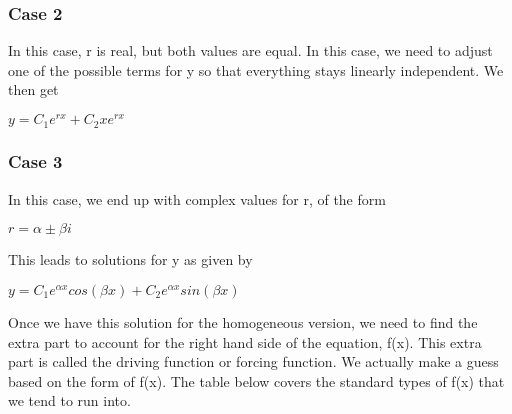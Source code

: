 \documentclass[
  letterpaper,
]{report}
\begin{document}
\subsubsection{Case 2}\label{case-2-1}

In this case, r is real, but both values are equal. In this case, we
need to adjust one of the possible terms for y so that everything stays
linearly independent. We then get

\(y = C_1 e^{r x} + C_2 x e^{r x}\)

\subsubsection{Case 3}\label{case-3-1}

In this case, we end up with complex values for r, of the form

\(r = \alpha \pm \beta i\)

This leads to solutions for y as given by

\(y = C_1 e^{\alpha x} cos(\beta x) + C_2 e^{\alpha x} sin(\beta x)\)

Once we have this solution for the homogeneous version, we need to find
the extra part to account for the right hand side of the equation, f(x).
This extra part is called the driving function or forcing function. We
actually make a guess based on the form of f(x). The table below covers
the standard types of f(x) that we tend to run into.
\end{document}

